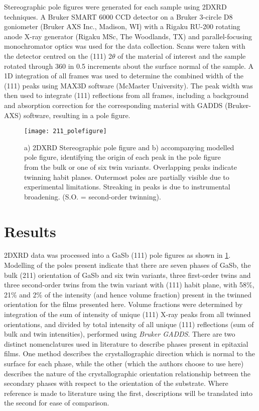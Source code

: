 Stereographic pole figures were generated for each sample using 2DXRD techniques.
A Bruker SMART 6000 CCD detector on a Bruker 3-circle D8 goniometer (Bruker AXS Inc., Madison, WI) with a Rigaku RU-200 rotating anode X-ray generator (Rigaku MSc, The Woodlands, TX) and parallel-focusing monochromator optics was used for the data collection.
Scans were taken with the detector centred on the (111) 2\(\theta\) of the material of interest and the sample rotated through 360\degree{} in 0.5\degree{} increments about the surface normal of the sample.
A 1D integration of all frames was used to determine the combined width of the (111) peaks using MAX3D software (McMaster University)\cite{Britten2007}.
The peak width was then used to integrate (111) reflections from all frames, including a background and absorption correction for the corresponding material with GADDS (Bruker-AXS) software, resulting in a pole figure.
\begin{figure}
 \centering \texttt{[image: 211\_polefigure]}
 \caption[Measured and simulated pole figure of thin film on 211 silicon]{\label{fig:211_polefigure}a) 2DXRD Stereographic pole figure and b) accompanying modelled pole figure, identifying the origin of each peak in the pole figure from the bulk or one of six twin variants.
  Overlapping peaks indicate twinning habit planes.
  Outermost poles are partially visible due to experimental limitations.
  Streaking in peaks is due to instrumental broadening.
  (S.O. = second-order twinning).}
\end{figure}

\section{Results}
2DXRD data was processed into a GaSb (111) pole figures as shown in \cref{fig:211_polefigure}.
Modelling of the poles present indicate that there are seven phases of GaSb, the bulk (211) orientation of GaSb and six twin variants, three first-order twins and three second-order twins from the twin variant with (111) habit plane, with 58\%, 21\% and 2\% of the intensity (and hence volume fraction) present in the twinned orientation for the films presented here.
Volume fractions were determined by integration of the sum of intensity of unique (111) X-ray peaks from all twinned orientations, and divided by total intensity of all unique (111) reflections (sum of bulk and twin intensities), performed using \textit{Bruker GADDS}.
There are two distinct nomenclatures used in literature to describe phases present in epitaxial films\cite{Kim2010a,Lange1991,Johnson2011,DeLyon1995}.
One method describes the crystallographic direction which is normal to the surface for each phase, while the other (which the authors choose to use here) describes the nature of the crystallographic orientation relationship between the secondary phases with respect to the orientation of the substrate.
Where reference is made to literature using the first, descriptions will be translated into the second for ease of comparison.

